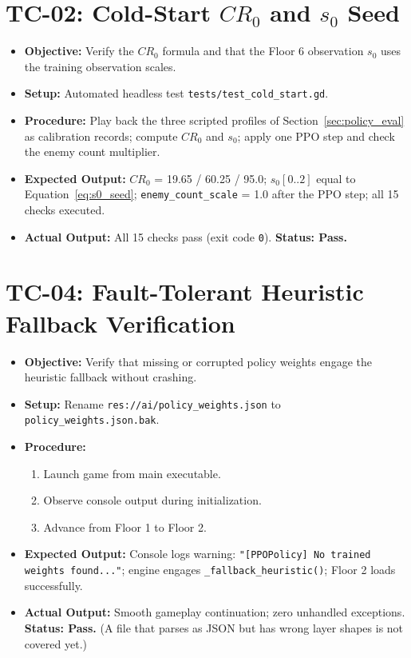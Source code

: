 \section{TC-02: Cold-Start $CR_0$ and $s_0$ Seed}
\begin{itemize}
    \item \textbf{Objective:} Verify the $CR_0$ formula and that the Floor 6 observation $s_0$ uses the training observation scales.
    \item \textbf{Setup:} Automated headless test \texttt{tests/test\_cold\_start.gd}.
    \item \textbf{Procedure:} Play back the three scripted profiles of Section~\ref{sec:policy_eval} as calibration records; compute $CR_0$ and $s_0$; apply one PPO step and check the enemy count multiplier.
    \item \textbf{Expected Output:} $CR_0$ = 19.65 / 60.25 / 95.0; $s_0[0..2]$ equal to Equation~\ref{eq:s0_seed}; \texttt{enemy\_count\_scale} = 1.0 after the PPO step; all 15 checks executed.
    \item \textbf{Actual Output:} All 15 checks pass (exit code \texttt{0}). \textbf{Status: Pass.}
\end{itemize}

\section{TC-04: Fault-Tolerant Heuristic Fallback Verification}
\begin{itemize}
    \item \textbf{Objective:} Verify that missing or corrupted policy weights engage the heuristic fallback without crashing.
    \item \textbf{Setup:} Rename \texttt{res://ai/\allowbreak policy\_\-weights.json} to \texttt{policy\_weights.json.bak}.
    \item \textbf{Procedure:}
    \begin{enumerate}
        \item Launch game from main executable.
        \item Observe console output during initialization.
        \item Advance from Floor 1 to Floor 2.
    \end{enumerate}
    \item \textbf{Expected Output:} Console logs warning: \texttt{"[PPOPolicy] No trained weights found..."}; engine engages \texttt{\_fallback\_heuristic()}; Floor 2 loads successfully.
    \item \textbf{Actual Output:} Smooth gameplay continuation; zero unhandled exceptions. \textbf{Status: Pass.} (A file that parses as JSON but has wrong layer shapes is not covered yet.)
\end{itemize}

